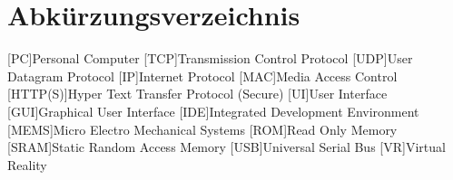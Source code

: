 \chapter*{Abkürzungsverzeichnis}
\begin{acronym}
    [PC]{Personal Computer}
    [TCP]{Transmission Control Protocol}
    [UDP]{User Datagram Protocol}
    [IP]{Internet Protocol}
    [MAC]{Media Access Control}
    [HTTP(S)]{Hyper Text Transfer Protocol (Secure)}
    [UI]{User Interface}
    [GUI]{Graphical User Interface}
    [IDE]{Integrated Development Environment}
    [MEMS]{Micro Electro Mechanical Systems}
    [ROM]{Read Only Memory}
    [SRAM]{Static Random Access Memory}
    [USB]{Universal Serial Bus}
    [VR]{Virtual Reality}
\end{acronym}